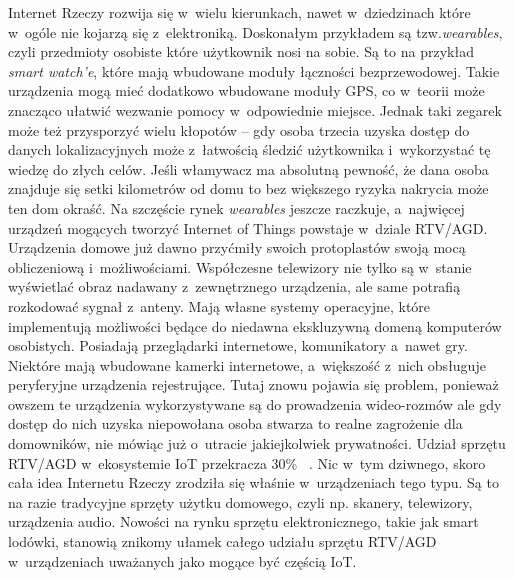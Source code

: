 \documentclass{xmgr}
\begin{document}
	Internet Rzeczy rozwija się w~wielu kierunkach, nawet w~dziedzinach które w~ogóle nie kojarzą się z~elektroniką. Doskonałym przykładem są tzw.\emph{wearables}, czyli przedmioty osobiste które użytkownik nosi na sobie. Są to na przykład \emph{smart watch'e}, które mają wbudowane moduły łączności bezprzewodowej.  Takie urządzenia mogą mieć dodatkowo wbudowane moduły GPS, co w~teorii może znacząco ułatwić wezwanie pomocy w~odpowiednie miejsce. Jednak taki zegarek może też przysporzyć wielu kłopotów – gdy osoba trzecia uzyska dostęp do danych lokalizacyjnych  może z~łatwością śledzić użytkownika i~wykorzystać tę wiedzę do złych celów. Jeśli włamywacz ma absolutną pewność, że dana osoba znajduje się setki kilometrów od domu to bez większego ryzyka nakrycia może ten dom okraść.
	Na szczęście rynek \emph{wearables} jeszcze raczkuje, a~najwięcej urządzeń mogących tworzyć Internet of Things powstaje w~dziale RTV/AGD. Urządzenia domowe już dawno przyćmiły swoich protoplastów swoją mocą obliczeniową i~możliwościami. Współczesne telewizory nie tylko są w~stanie wyświetlać obraz nadawany z~zewnętrznego urządzenia, ale same potrafią rozkodować sygnał z~anteny. Mają własne systemy operacyjne, które implementują możliwości będące do niedawna ekskluzywną domeną komputerów osobistych. Posiadają przeglądarki internetowe, komunikatory a~nawet gry. Niektóre mają wbudowane kamerki internetowe, a~większość z~nich obsługuje peryferyjne urządzenia rejestrujące. Tutaj znowu pojawia się problem, ponieważ owszem te urządzenia wykorzystywane są do prowadzenia wideo-rozmów ale gdy dostęp do nich uzyska niepowołana osoba stwarza to realne zagrożenie dla domowników, nie mówiąc już o~utracie jakiejkolwiek prywatności.
	Udział sprzętu RTV/AGD w~ekosystemie IoT przekracza 30\%~ \cite{IotWPolsce:2015:CMC}. Nic w~tym dziwnego, skoro cała idea Internetu Rzeczy zrodziła się właśnie w~urządzeniach tego typu. Są to na razie tradycyjne sprzęty użytku domowego, czyli np. skanery, telewizory, urządzenia audio. Nowości na rynku sprzętu elektronicznego, takie jak smart lodówki, stanowią znikomy ułamek całego udziału sprzętu RTV/AGD w~urządzeniach uważanych jako mogące być częścią IoT.
\end{document}

